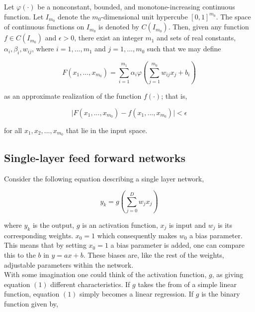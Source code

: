 \documentclass[12pt, letterpaper]{amsart}%
\begin{document}
\begin{mydef}
Let $\varphi (\cdot)$ be a nonconstant, bounded, and monotone-increasing continuous function. Let $I_{m_0}$ denote the $m_0$-dimensional unit hypercube $[0,1]^{m_0}$. The space of continuous functions on $I_{m_0}$ is denoted by $C(I_{m_0})$. Then, given any function $f \in C(I_{m_0})$ and $\epsilon > 0$, there exist an integer $m_1$ and sets of real constants, $\alpha_i, \beta_i, w_{ij}$, where $i = 1, ...,m_1$ and $j = 1, ...,m_0$ such that we may define

\begin{equation}
    F(x_1, ..., x_{m_0}) = \sum_{i=1}^{m_1} \alpha_i \varphi \left( \sum_{j=1}^{m_0} w_{ij} x_j + b_i \right)
\end{equation}

as an approximate realization of the function $f(\cdot)$; that is,

\begin{equation}
    \vert F(x_1, ..., x_{m_0}) - f(x_1, ..., x_{m_0}) \vert < \epsilon
\end{equation}

for all $x_1, x_2, ..., x_{m_0}$ that lie in the input space.

\end{mydef}

\subsection{Single-layer feed forward networks}
Consider the following equation describing a single layer network,

\begin{equation}
y_k = g \left( \sum_{j=0}^D w_j x_j \right)
\end{equation}

where $y_k$ is the output, $g$ is an activation function, $x_j$ is input and $w_j$ is its corresponding weights. $x_0 = 1$ which consequently makes $w_0$ a bias parameter. This means that by setting $x_0=1$ a bias parameter is added, one can compare this to the $b$ in $y = ax + b$. These biases are, like the rest of the weights, adjustable parameters within the network.
\\

With some imagination one could think of the activation function, $g$, as giving equation $(1)$ different characteristics. If $g$ takes the from of a simple linear function, equation $(1)$ simply becomes a linear regression. If $g$ is the binary function given by,
\end{document}
